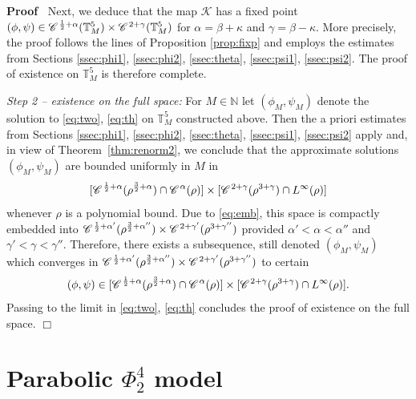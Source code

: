 \documentclass[a4paper,11pt]{article}
\newenvironment{proof}{\noindent\textbf{Proof\ }}{\hspace*{\fill}$\Box$\medskip}
\numberwithin{equation}{section}
\newcommand{\CC}{\mathscr{C} \hspace{.1em}}
\newcommand{\N}{\mathbb{N}}
\newcommand{\8}{\infty}
\begin{document}
\begin{proof}
Next, we deduce that  the map $\mathcal{K}$ has a fixed point $(\phi,\psi)\in \CC^{\frac 12+\alpha} (\mathbb{T}_{M}^{5})\times \CC^{2+\gamma}(\mathbb{T}_{M}^{5})$ for $\alpha=\beta+\kappa$ and $\gamma=\beta-\kappa$. More precisely, the proof follows the lines of Proposition \ref{prop:fixp} and employs the estimates from Sections \ref{ssec:phi1}, \ref{ssec:phi2},  \ref{ssec:theta}, \ref{ssec:psi1}, \ref{ssec:psi2}. The proof of existence on $\mathbb{T}^{5}_{M}$ is therefore complete.




 \emph{Step 2 -- existence on the full space:} For $M\in\N$ let  $(\phi_{M},\psi_{M})$ denote the solution to \eqref{eq:two}, \eqref{eq:th} on $\mathbb{T}^{5}_{M}$  constructed above.
Then  the a priori estimates from Sections \ref{ssec:phi1}, \ref{ssec:phi2},  \ref{ssec:theta}, \ref{ssec:psi1}, \ref{ssec:psi2} apply and, in view of Theorem~\ref{thm:renorm2}, we conclude that the approximate solutions $(\phi_{M},\psi_{M})$ are bounded uniformly in $M$ in
$$[ \CC^{\frac 12+\alpha}(\rho^{\frac 32+\alpha})\cap \CC^{\alpha}(\rho)]\times[\CC^{2+\gamma}(\rho^{3+\gamma})\cap L^{\infty}(\rho)]$$
whenever $\rho$ is a polynomial bound. Due to \eqref{eq:emb}, this space is compactly embedded into $\CC^{\frac 12+\alpha'}(\rho^{\frac 32+\alpha''})\times\CC^{2+\gamma'}(\rho^{3+\gamma''})$ provided $\alpha'<\alpha<\alpha''$ and $\gamma'<\gamma<\gamma''$. Therefore, there exists a subsequence, still denoted $(\phi_{M},\psi_{M})$ which converges in $\CC^{\frac 12+\alpha'}(\rho^{\frac 32+\alpha''})\times\CC^{2+\gamma'}(\rho^{3+\gamma''})$ to certain
$$(\phi,\psi)\in  [ \CC^{\frac 12+\alpha}(\rho^{\frac 32+\alpha})\cap \CC^{\alpha}(\rho)]\times[\CC^{2+\gamma}(\rho^{3+\gamma})\cap L^{\infty}(\rho)].$$
Passing to the limit in  \eqref{eq:two}, \eqref{eq:th} concludes the proof of existence on the full space.
\end{proof}





\section{Parabolic $\Phi^4_2$ model}
\label{sec:42}
\end{document}
